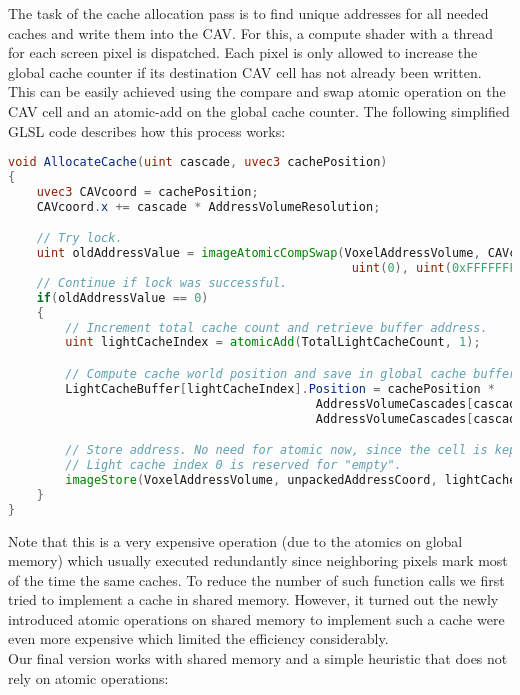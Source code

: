 \documentclass[thesis.tex]{subfiles}
\begin{document}
The task of the cache allocation pass is to find unique addresses for all needed caches and write them into the CAV.
For this, a compute shader with a thread for each screen pixel is dispatched.
Each pixel is only allowed to increase the global cache counter if its destination CAV cell has not already been written.
This can be easily achieved using the compare and swap atomic operation on the CAV cell and an atomic-add on the global cache counter.
The following simplified GLSL code describes how this process works:
\begin{lstlisting}[language=GLSL]
void AllocateCache(uint cascade, uvec3 cachePosition)
{
	uvec3 CAVcoord = cachePosition;
	CAVcoord.x += cascade * AddressVolumeResolution;

	// Try lock.
	uint oldAddressValue = imageAtomicCompSwap(VoxelAddressVolume, CAVcoord, 
                                                uint(0), uint(0xFFFFFFFF));
	// Continue if lock was successful.
	if(oldAddressValue == 0)
	{
		// Increment total cache count and retrieve buffer address.
		uint lightCacheIndex = atomicAdd(TotalLightCacheCount, 1);

		// Compute cache world position and save in global cache buffer.
		LightCacheBuffer[lightCacheIndex].Position = cachePosition *
		                                   AddressVolumeCascades[cascade].WorldVoxelSize +
		                                   AddressVolumeCascades[cascade].Min;

		// Store address. No need for atomic now, since the cell is kept locked.
		// Light cache index 0 is reserved for "empty".
		imageStore(VoxelAddressVolume, unpackedAddressCoord, lightCacheIndex + 1);
	}
}
\end{lstlisting}
Note that this is a very expensive operation (due to the atomics on global memory) which usually executed redundantly since neighboring pixels mark most of the time the same caches.
To reduce the number of such function calls we first tried to implement a cache in shared memory.
However, it turned out the newly introduced atomic operations on shared memory to implement such a cache were even more expensive which limited the efficiency considerably.
\\
Our final version works with shared memory and a simple heuristic that does not rely on atomic operations:
\end{document}
